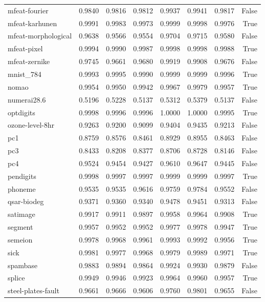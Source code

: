 \begin{table}[htbp]
\begin{tabular}{lrrrrrrr}
mfeat-fourier & 0.9840 & 0.9816 & 0.9812 & 0.9937 & 0.9941 & 0.9817 & False \\
mfeat-karhunen & 0.9991 & 0.9983 & 0.9973 & 0.9999 & 0.9998 & 0.9976 & True \\
mfeat-morphological & 0.9638 & 0.9566 & 0.9554 & 0.9704 & 0.9715 & 0.9580 & False \\
mfeat-pixel & 0.9994 & 0.9990 & 0.9987 & 0.9998 & 0.9998 & 0.9988 & True \\
mfeat-zernike & 0.9745 & 0.9661 & 0.9680 & 0.9919 & 0.9908 & 0.9676 & False \\
mnist\_784 & 0.9993 & 0.9995 & 0.9990 & 0.9999 & 0.9999 & 0.9996 & True \\
nomao & 0.9954 & 0.9950 & 0.9942 & 0.9967 & 0.9979 & 0.9957 & True \\
numerai28.6 & 0.5196 & 0.5228 & 0.5137 & 0.5312 & 0.5379 & 0.5137 & False \\
optdigits & 0.9998 & 0.9996 & 0.9996 & 1.0000 & 1.0000 & 0.9995 & True \\
ozone-level-8hr & 0.9263 & 0.9200 & 0.9099 & 0.9404 & 0.9435 & 0.9213 & False \\
pc1 & 0.8759 & 0.8576 & 0.8461 & 0.8929 & 0.8955 & 0.8463 & False \\
pc3 & 0.8433 & 0.8208 & 0.8377 & 0.8706 & 0.8728 & 0.8146 & False \\
pc4 & 0.9524 & 0.9454 & 0.9427 & 0.9610 & 0.9647 & 0.9445 & False \\
pendigits & 0.9998 & 0.9997 & 0.9997 & 0.9999 & 0.9999 & 0.9997 & True \\
phoneme & 0.9535 & 0.9535 & 0.9616 & 0.9759 & 0.9784 & 0.9552 & False \\
qsar-biodeg & 0.9371 & 0.9360 & 0.9340 & 0.9478 & 0.9451 & 0.9313 & False \\
satimage & 0.9917 & 0.9911 & 0.9897 & 0.9958 & 0.9964 & 0.9908 & True \\
segment & 0.9957 & 0.9952 & 0.9952 & 0.9977 & 0.9978 & 0.9947 & True \\
semeion & 0.9978 & 0.9968 & 0.9961 & 0.9993 & 0.9992 & 0.9956 & True \\
sick & 0.9981 & 0.9977 & 0.9968 & 0.9979 & 0.9989 & 0.9971 & True \\
spambase & 0.9883 & 0.9894 & 0.9864 & 0.9924 & 0.9930 & 0.9879 & False \\
splice & 0.9949 & 0.9946 & 0.9923 & 0.9964 & 0.9960 & 0.9957 & True \\
steel-plates-fault & 0.9661 & 0.9666 & 0.9606 & 0.9760 & 0.9801 & 0.9655 & False \\

\end{tabular}
\end{table}

